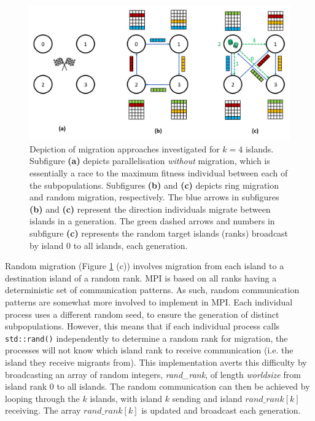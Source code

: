 \documentclass{report}
\begin{document}
\begin{figure}
\includegraphics[scale=0.55]{migration_diagram}
\caption{Depiction of migration approaches investigated for \(k=4\) islands. Subfigure \textbf{(a)} depicts parallelisation \emph{without} migration, which is essentially a race to the maximum fitness individual between each of the subpopulations. Subfigures \textbf{(b)} and  \textbf{(c)} depicts ring migration and random migration, respectively. The blue arrows in subfigures \textbf{(b)} and  \textbf{(c)} represent the direction individuals migrate between islands in a generation. The green dashed arrows and numbers in subfigure \textbf{(c)} represents the random target islands (ranks) broadcast by island 0 to all islands, each generation.}
\label{migration_diagram}
\end{figure}

Random migration (Figure \ref{migration_diagram} (c)) involves migration from each island to a destination island of a random rank. MPI is based on all ranks having a deterministic set of communication patterns. As such, random communication patterns are somewhat more involved to implement in MPI. Each individual process uses a different random seed, to ensure the generation of distinct subpopulations. However, this means that if each individual process calls \texttt{std::rand()} independently to determine a random rank for migration, the processes will not know which island rank to receive communication (i.e. the island they receive migrants from). This implementation averts this difficulty by broadcasting an array of random integers, \emph{rand\_rank}, of length \emph{worldsize} from island rank 0 to all islands. The random communication can then be achieved by looping through the \(k\) islands, with island \(k\) sending and island \(rand\_rank[k]\) receiving. The array \(rand\_rank[k]\) is updated and broadcast each generation.
\end{document}
